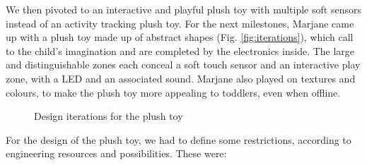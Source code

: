 \medskip We then pivoted to an interactive and playful plush toy with multiple soft sensors instead of an activity tracking plush toy. For the next milestones, Marjane came up with a plush toy made up of abstract shapes (Fig. \ref{fig:iterations}), which call to the child's imagination and are completed by the electronics inside. The large and distinguishable zones each conceal a soft touch sensor and an interactive play zone, with a LED and an associated sound. Marjane also played on textures and colours, to make the plush toy more appealing to toddlers, even when offline. 

\begin{figure}[H]
    \centering
    \hfill
    \hfill
    \hfill
    \caption{Design iterations for the plush toy} 
    \label{fig:industrial_design}
\end{figure}


For the design of the plush toy, we had to define some restrictions, according to engineering resources and possibilities. These were: 

